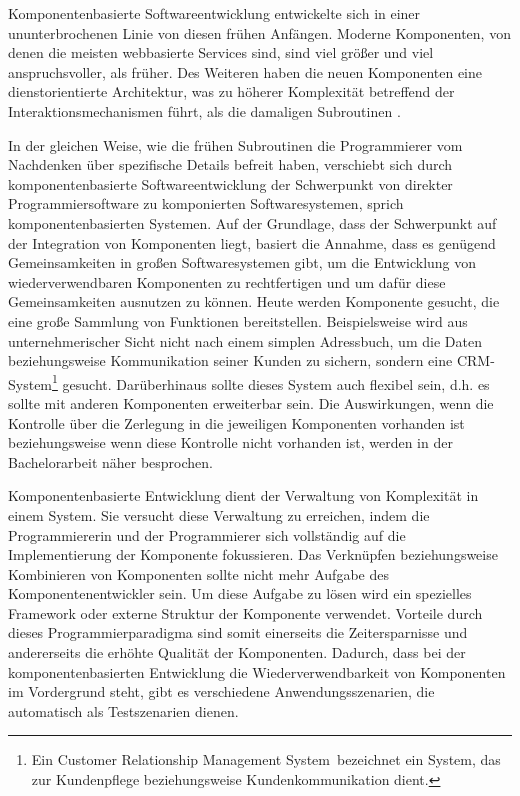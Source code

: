 Komponentenbasierte Softwareentwicklung entwickelte sich in einer ununterbrochenen Linie von diesen frühen Anfängen. Moderne Komponenten, von denen die meisten webbasierte Services sind, sind viel größer und viel anspruchsvoller, als früher. Des Weiteren haben die neuen Komponenten eine dienstorientierte Architektur, was zu höherer Komplexität betreffend der Interaktionsmechanismen führt, als die damaligen Subroutinen \autocite{Andresen.2003}.

In der gleichen Weise, wie die frühen Subroutinen die Programmierer vom Nachdenken über spezifische Details befreit haben, verschiebt sich durch komponentenbasierte Softwareentwicklung der Schwerpunkt von direkter Programmiersoftware zu komponierten Softwaresystemen, sprich komponentenbasierten Systemen. Auf der Grundlage, dass der Schwerpunkt auf der Integration von Komponenten liegt, basiert die Annahme, dass es genügend Gemeinsamkeiten in  großen Softwaresystemen gibt, um die Entwicklung von wiederverwendbaren Komponenten zu rechtfertigen und um dafür diese Gemeinsamkeiten ausnutzen zu können. Heute werden Komponente gesucht, die eine große Sammlung von Funktionen bereitstellen. Beispielsweise wird aus unternehmerischer Sicht nicht nach einem simplen Adressbuch, um die Daten beziehungsweise Kommunikation seiner Kunden zu sichern, sondern eine CRM-System\footnote{Ein \glqq Customer Relationship Management System\grqq\ bezeichnet ein System, das zur Kundenpflege beziehungsweise Kundenkommunikation dient.} gesucht. Darüberhinaus sollte dieses System auch flexibel sein, d.h. es sollte mit anderen Komponenten erweiterbar sein. Die Auswirkungen, wenn die Kontrolle über die Zerlegung in die jeweiligen Komponenten vorhanden ist beziehungsweise wenn diese Kontrolle nicht vorhanden ist, werden in der Bachelorarbeit näher besprochen\citereset \autocite{Andresen.2003}.

Komponentenbasierte Entwicklung dient der Verwaltung von Komplexität in einem System. Sie versucht diese Verwaltung zu erreichen, indem die Programmiererin und der Programmierer sich vollständig auf die Implementierung der Komponente fokussieren. Das Verknüpfen beziehungsweise Kombinieren von Komponenten sollte nicht mehr Aufgabe des Komponentenentwickler sein. Um diese Aufgabe zu lösen wird ein spezielles Framework oder externe Struktur der Komponente verwendet. Vorteile durch dieses Programmierparadigma sind somit einerseits die Zeitersparnisse und andererseits die erhöhte Qualität der Komponenten. Dadurch, dass bei der komponentenbasierten Entwicklung die Wiederverwendbarkeit von Komponenten im Vordergrund steht, gibt es verschiedene Anwendungsszenarien, die automatisch als Testszenarien dienen\citereset \autocite{Andresen.2003}.

